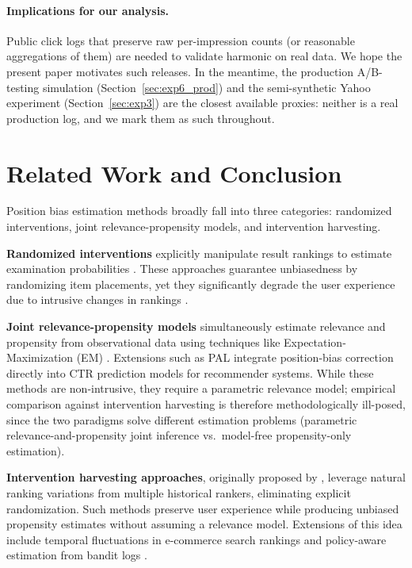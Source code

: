 \documentclass[sigconf]{acmart}
\begin{document}
\paragraph{Implications for our analysis.}
Public click logs that preserve raw per-impression counts (or reasonable aggregations of them)
are needed to validate harmonic on real data. We hope the present paper motivates such releases.
In the meantime, the production A/B-testing simulation (Section~\ref{sec:exp6_prod}) and the
semi-synthetic Yahoo experiment (Section~\ref{sec:exp3}) are the closest available proxies:
neither is a real production log, and we mark them as such throughout.

\section{Related Work and Conclusion}
\label{sec:related_work}

Position bias estimation methods broadly fall into three categories: randomized interventions, joint relevance-propensity models, and intervention harvesting.

\textbf{Randomized interventions} explicitly manipulate result rankings to estimate examination probabilities \cite{joachims2017unbiased, wang2018position}. These approaches guarantee unbiasedness by randomizing item placements, yet they significantly degrade the user experience due to intrusive changes in rankings \cite{joachims2017unbiased}.

\textbf{Joint relevance-propensity models} simultaneously estimate relevance and propensity from observational data using techniques like Expectation-Maximization (EM) \cite{wang2018position, wang2018position}. Extensions such as PAL \cite{pai2020pal} integrate position-bias correction directly into CTR prediction models for recommender systems. While these methods are non-intrusive, they require a parametric relevance model; empirical comparison against intervention harvesting is therefore methodologically ill-posed, since the two paradigms solve different estimation problems (parametric relevance-and-propensity joint inference vs.\ model-free propensity-only estimation).

\textbf{Intervention harvesting approaches}, originally proposed by \cite{agarwal2019estimating}, leverage natural ranking variations from multiple historical rankers, eliminating explicit randomization. Such methods preserve user experience while producing unbiased propensity estimates without assuming a relevance model. Extensions of this idea include temporal fluctuations in e-commerce search rankings \cite{aslanyan2019eCommerceBias} and policy-aware estimation from bandit logs \cite{oosterhuis2023DoublyRobustLTR}.
\end{document}
